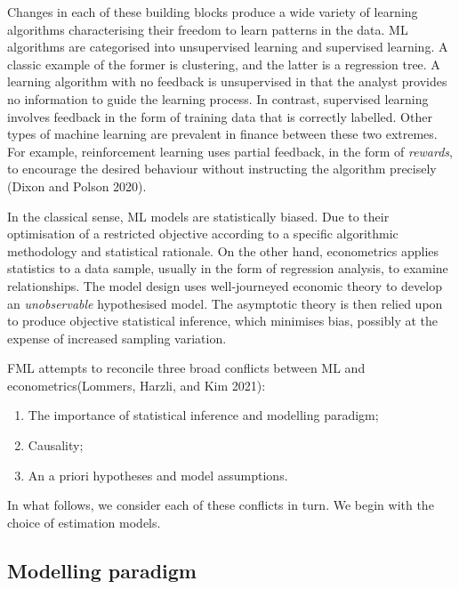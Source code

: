 \documentclass{article}
\providecommand{\tightlist}{%
  \setlength{\itemsep}{0pt}\setlength{\parskip}{0pt}}
\begin{document}
Changes in each of these building blocks produce a wide variety of
learning algorithms characterising their freedom to learn patterns in
the data. ML algorithms are categorised into unsupervised learning and
supervised learning. A classic example of the former is clustering, and
the latter is a regression tree. A learning algorithm with no feedback
is unsupervised in that the analyst provides no information to guide the
learning process. In contrast, supervised learning involves feedback in
the form of training data that is correctly labelled. Other types of
machine learning are prevalent in finance between these two extremes.
For example, reinforcement learning uses partial feedback, in the form
of \emph{rewards}, to encourage the desired behaviour without
instructing the algorithm precisely (Dixon and Polson 2020).

In the classical sense, ML models are statistically biased. Due to their
optimisation of a restricted objective according to a specific
algorithmic methodology and statistical rationale. On the other hand,
econometrics applies statistics to a data sample, usually in the form of
regression analysis, to examine relationships. The model design uses
well-journeyed economic theory to develop an \emph{unobservable}
hypothesised model. The asymptotic theory is then relied upon to produce
objective statistical inference, which minimises bias, possibly at the
expense of increased sampling variation.

FML attempts to reconcile three broad conflicts between ML and
econometrics(Lommers, Harzli, and Kim 2021):

\begin{enumerate}
\def\labelenumi{\arabic{enumi}.}
\tightlist
\item
  The importance of statistical inference and modelling paradigm;
\item
  Causality;
\item
  An a priori hypotheses and model assumptions.
\end{enumerate}

In what follows, we consider each of these conflicts in turn. We begin
with the choice of estimation models.

\hypertarget{modelling-paradigm}{%
\subsection{Modelling paradigm}\label{modelling-paradigm}}
\end{document}
